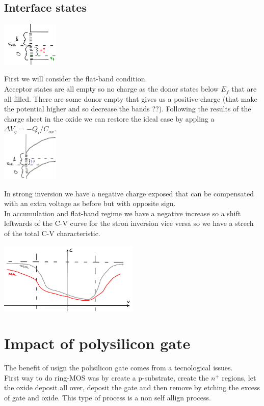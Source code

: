 \subsection{Interface states}

\centering
\includegraphics[width=0.2\textwidth]{istafb.png}\\
\raggedright

First we will consider the flat-band condition.\\
Acceptor states are all empty so no charge as the donor states below $E_f$ that are all filled. There are some donor empty that gives us a positive charge (that make the potential higher and so decrease the bands ??). Following the results of the charge sheet in the oxide we can restore the ideal case by appling a $\Delta V_g= -Q_i/C_{ox}$.\\

\centering
\includegraphics[width=0.2\textwidth]{istasi.png}\\
\raggedright

In strong inversion we have a negative charge exposed that can be compensated with an extra voltage as before but with opposite sign.\\
In accumulation and flat-band regime we have a negative increase so a shift leftwards of the C-V curve for the stron inversion vice versa so we have a strech of the total C-V characteristic.

\centering
\includegraphics[width=0.5\textwidth]{cvis.png}\\
\raggedright

\section{Impact of polysilicon gate}
The benefit of usign the polisilicon gate comes from a tecnological issues.\\
First way to do ring-MOS was by create a p-substrate, create the $n^+$ regions, let the oxide deposit all over, deposit the gate and then remove by etching the excess of gate and oxide. This type of process is a non self allign process.\\

